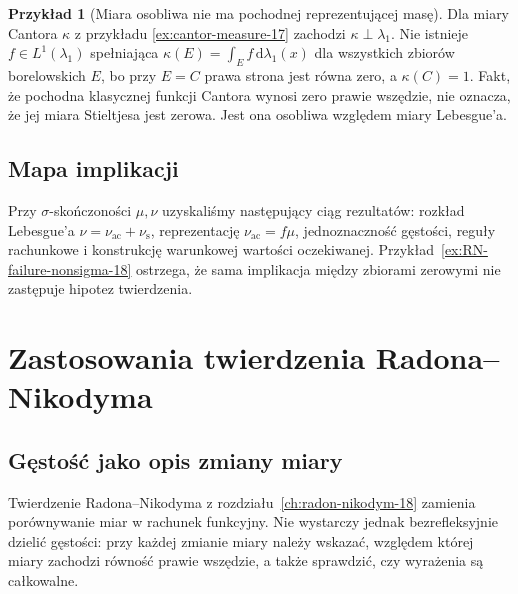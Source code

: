 \documentclass[11pt,a4paper,oneside]{book}
\numberwithin{equation}{chapter}
\theoremstyle{plain}
\theoremstyle{definition}
\newtheorem{przyklad}[twierdzenie]{Przykład}
\theoremstyle{remark}
\begin{document}
\begin{przyklad}[Miara osobliwa nie ma pochodnej reprezentującej masę]
Dla miary Cantora $\kappa$ z przykładu
\ref{ex:cantor-measure-17} zachodzi
$\kappa\perp\lambda_1$. Nie istnieje
$f\in L^1(\lambda_1)$ spełniająca
$\kappa(E)=\int_Ef\,\mathrm d\lambda_1(x)$ dla wszystkich
zbiorów borelowskich $E$, bo przy $E=C$ prawa strona
jest równa zero, a $\kappa(C)=1$.
Fakt, że pochodna klasycznej funkcji Cantora wynosi
zero prawie wszędzie, nie oznacza, że jej miara
Stieltjesa jest zerowa. Jest ona osobliwa względem
miary Lebesgue'a.
\end{przyklad}

\section{Mapa implikacji}
Przy $\sigma$-skończoności $\mu,\nu$ uzyskaliśmy
następujący ciąg rezultatów: rozkład Lebesgue'a
$\nu=\nu_{\mathrm{ac}}+\nu_{\mathrm{s}}$,
reprezentację $\nu_{\mathrm{ac}}=f\mu$,
jednoznaczność gęstości, reguły rachunkowe i
konstrukcję warunkowej wartości oczekiwanej.
Przykład~\ref{ex:RN-failure-nonsigma-18} ostrzega,
że sama implikacja między zbiorami zerowymi
nie zastępuje hipotez twierdzenia.



\chapter{Zastosowania twierdzenia Radona--Nikodyma}
\label{ch:rn-applications-19}

\section{Gęstość jako opis zmiany miary}
Twierdzenie Radona--Nikodyma z rozdziału~\ref{ch:radon-nikodym-18}
zamienia porównywanie miar w rachunek funkcyjny. Nie wystarczy jednak
bezrefleksyjnie dzielić gęstości: przy każdej zmianie miary należy
wskazać, względem której miary zachodzi równość prawie wszędzie,
a także sprawdzić, czy wyrażenia są całkowalne.
\end{document}
